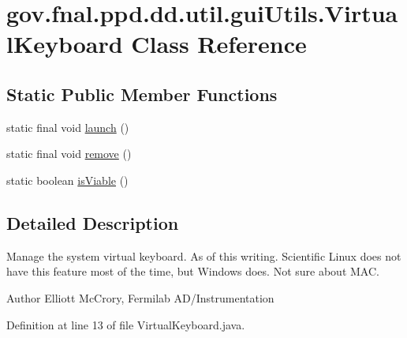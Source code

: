 \hypertarget{classgov_1_1fnal_1_1ppd_1_1dd_1_1util_1_1guiUtils_1_1VirtualKeyboard}{\section{gov.\-fnal.\-ppd.\-dd.\-util.\-gui\-Utils.\-Virtual\-Keyboard Class Reference}
\label{classgov_1_1fnal_1_1ppd_1_1dd_1_1util_1_1guiUtils_1_1VirtualKeyboard}
}
\subsection*{Static Public Member Functions}
\begin{DoxyCompactItemize}
\item 
static final void \hyperlink{classgov_1_1fnal_1_1ppd_1_1dd_1_1util_1_1guiUtils_1_1VirtualKeyboard_a9fd433156506d4941931cd57f30e30cc}{launch} ()
\item 
static final void \hyperlink{classgov_1_1fnal_1_1ppd_1_1dd_1_1util_1_1guiUtils_1_1VirtualKeyboard_a0b339889e908be4ef22fb75ec48ce82f}{remove} ()
\item 
static boolean \hyperlink{classgov_1_1fnal_1_1ppd_1_1dd_1_1util_1_1guiUtils_1_1VirtualKeyboard_a6de1d707a87c165fe832b796e6a5b7ef}{is\-Viable} ()
\end{DoxyCompactItemize}


\subsection{Detailed Description}
Manage the system virtual keyboard. As of this writing. Scientific Linux does not have this feature most of the time, but Windows does. Not sure about M\-A\-C.

\begin{DoxyAuthor}{Author}
Elliott Mc\-Crory, Fermilab A\-D/\-Instrumentation 
\end{DoxyAuthor}


Definition at line 13 of file Virtual\-Keyboard.\-java.



